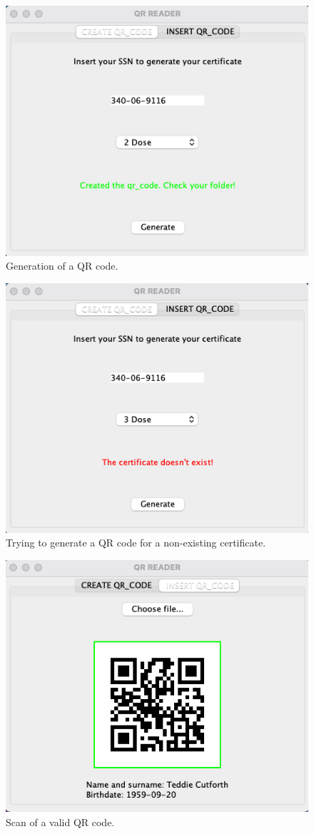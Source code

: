\documentclass[12pt, a4paper]{article}
\begin{document}
\begin{figure}[h]
    \centering
    \includegraphics[width=.6\linewidth]{app_1.png}
    \caption*{Generation of a QR code.} %
\end{figure}
\vspace{2cm}
\begin{figure}[h]
    \centering
    \includegraphics[width=.6\linewidth]{app_2.png}
    \caption*{Trying to generate a QR code for a non-existing certificate.} %
\end{figure}
\begin{figure}[h]
    \centering
    \includegraphics[width=.6\linewidth]{app_3.png}
    \caption*{Scan of a valid QR code.} %
\end{figure}
\end{document}
